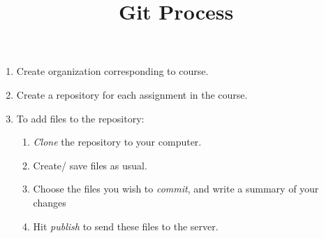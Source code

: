 \documentclass[12pt]{amsart}
\title{Git Process}
\theoremstyle{definition}
\begin{document}
\pagestyle{plain}


\maketitle

\begin{enumerate}
\item Create organization corresponding to course.
\item Create a repository for each assignment in the course.
\item To add files to the repository:
\begin{enumerate}
\item \emph{Clone} the repository to your computer.
\item Create/ save files as usual.
\item Choose the files you wish to \emph{commit}, and write a summary of your changes
\item Hit \emph{publish} to send these files to the server.
\end{enumerate}
\end{enumerate}
\end{document}
